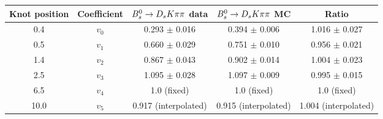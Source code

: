 \begin{tabular}{c c c c c}
\hline
\hline
Knot position & Coefficient & ${{B}^0_{s}}\rightarrow{\ensuremath{{D}_{s}}}{\ensuremath{K}}{\ensuremath{\pi}}{\ensuremath{\pi}}$ data & ${{B}^0_{s}}\rightarrow{\ensuremath{{D}_{s}}}{\ensuremath{K}}{\ensuremath{\pi}}{\ensuremath{\pi}}$ MC & Ratio \\
\hline
0.4 & $v_{0}$ & 0.293 $\pm$ 0.016 & 0.394 $\pm$ 0.006 & 1.016 $\pm$ 0.027\\
0.5 & $v_{1}$ & 0.660 $\pm$ 0.029 & 0.751 $\pm$ 0.010 & 0.956 $\pm$ 0.021\\
1.4 & $v_{2}$ & 0.867 $\pm$ 0.043 & 0.902 $\pm$ 0.014 & 1.004 $\pm$ 0.023\\
2.5 & $v_{3}$ & 1.095 $\pm$ 0.028 & 1.097 $\pm$ 0.009 & 0.995 $\pm$ 0.015\\
6.5 & $v_{4}$ &  1.0 (fixed) & 1.0 (fixed) & 1.0 (fixed)\\
10.0 & $v_{5}$ & 0.917 (interpolated) & 0.915 (interpolated) & 1.004 (interpolated) \\
\hline
\hline
\end{tabular}

